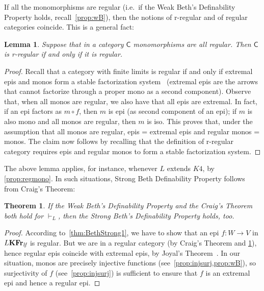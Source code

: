 \documentclass{article}
\newtheorem{thm}{Theorem}
\newtheorem{lem}{Lemma}
\theoremstyle{definition}
\newcommand{\KFr}{\textup{\textbf{KFr}}}
\newcommand{\lf}{\textit{lf}}
\begin{document}
%
If all the monomorphisms are regular (i.e.\ if the Weak Beth's Definability Property holds, recall~\cref{prop:wB}), then the notions of r-regular and of regular categories coincide. This is a general fact:
\begin{lem}\label{lem:rreg}
Suppose that in a category  $\mathsf{C}$ monomorphisms are all regular. Then  $\mathsf{C}$ is r-regular if and only if it is regular.   
\end{lem}
\begin{proof}
Recall that a category with finite limits is regular if and only if extremal epis and monos form a stable factorization system~\cite[Section A1.3]{elephant} (extremal epis are the arrows that cannot factorize through a proper mono as a second component). Observe that, when all monos are regular, we also have that all epis are extremal. In fact, if an epi factors as $m\circ f$, then $m$ is epi (as second component of an epi); if $m$ is also mono and all monos are regular, then $m$ is iso. This proves that, under the assumption that all monos are regular, epis = extremal epis and regular monos = monos. The claim now follows by recalling that the definition of r-regular category requires epis and regular monos to form a stable factorization system.
\end{proof}

The above lemma applies,
for instance, whenever $L$ extends $K4$, by \cref{prop:regmono}. In such situations, Strong Beth Definability Property follows from Craig's Theorem:
\begin{thm}
 If the Weak Beth's Definability Property and the Craig's Theorem both hold for $\vdash_L$, then the Strong Beth's Definability Property holds, too.   
\end{thm}
 
\begin{proof}
According to~\cref{thm:BethStrong1}, we have to show that an epi $f \colon W \longrightarrow V$ in $L\KFr_\lf$ is regular. But we are in  a regular category (by Craig's Theorem and \cref{lem:rreg}), hence regular epis coincide with extremal epis, by Joyal's Theorem~\cite[Proposition 1.3.4]{elephant}.
In our situation, monos are precisely injective functions (see~\cref{prop:injsurj,prop:wB}), so surjectivity of $f$ (see~\cref{prop:injsurj}) is sufficient to ensure that $f$ is an extremal epi and hence a regular epi.
\end{proof}
 
\end{document}
